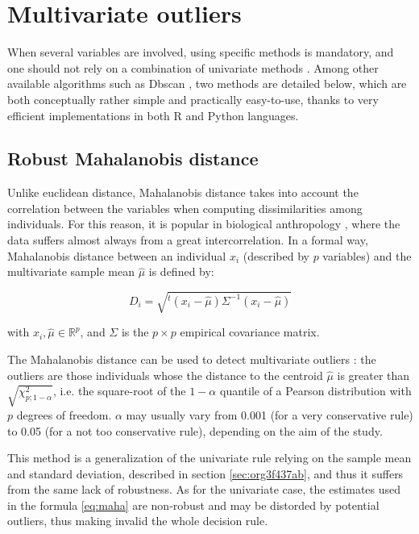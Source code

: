 \documentclass[review, 3p]{elsarticle}
\begin{document}
\section{Multivariate outliers}
\label{sec:orga619d44}
When several variables are involved, using specific methods is mandatory, and one should not rely on a combination of univariate methods \citep{leys2018_DetectingMultivariateOutliers}. Among other available algorithms such as Dbscan \citep{ester1996_DensitybasedAlgorithmDiscovering}, two methods are detailed below, which are both conceptually rather simple and practically easy-to-use, thanks to very efficient implementations in both R and Python languages.

\subsection{Robust Mahalanobis distance}
\label{sec:orgfddc5ae}
Unlike euclidean distance, Mahalanobis distance takes into account the correlation between the variables when computing dissimilarities among individuals. For this reason, it is popular in biological anthropology \citep{pilloud2016_BiologicalDistanceAnalysis}, where the data suffers almost always from a great intercorrelation. In a formal way, Mahalanobis distance between an individual \(x_i\) (described by \(p\) variables) and the multivariate sample mean \(\hat{\mu}\) is defined by:

\begin{equation}
D_{i} = \sqrt{{}^t(x_i - \hat{\mu}) \Sigma^{-1} (x_i - \hat{\mu})} \label{eq:maha}
\end{equation}

with \(x_i, \hat{\mu} \in \mathbb{R}^p\), and \(\Sigma\) is the \(p \times p\) empirical covariance matrix.

The Mahalanobis distance can be used to detect multivariate outliers \citep[e.g.,][]{stynder2009_CraniometricEvidenceSouth}: the outliers are those individuals whose the distance to the centroid \(\hat{\mu}\) is greater than \(\sqrt{\chi^2_{p; 1-\alpha}}\), i.e. the square-root of the \(1-\alpha\) quantile of a Pearson distribution with \(p\) degrees of freedom. \(\alpha\) may usually vary from 0.001 (for a very conservative rule) to 0.05 (for a not too conservative rule), depending on the aim of the study.

This method is a generalization of the univariate rule relying on the sample mean and standard deviation, described in section \ref{sec:org3f437ab}, and thus it suffers from the same lack of robustness. As for the univariate case, the estimates used in the formula \eqref{eq:maha} are non-robust and may be distorded by potential outliers, thus making invalid the whole decision rule.
\end{document}
